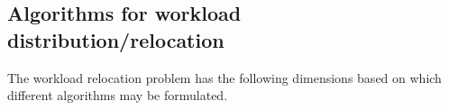 

\subsection{Algorithms for workload distribution/relocation}
\label{subsec:metrics} The workload relocation problem has the following dimensions based on which different algorithms may be formulated. 

